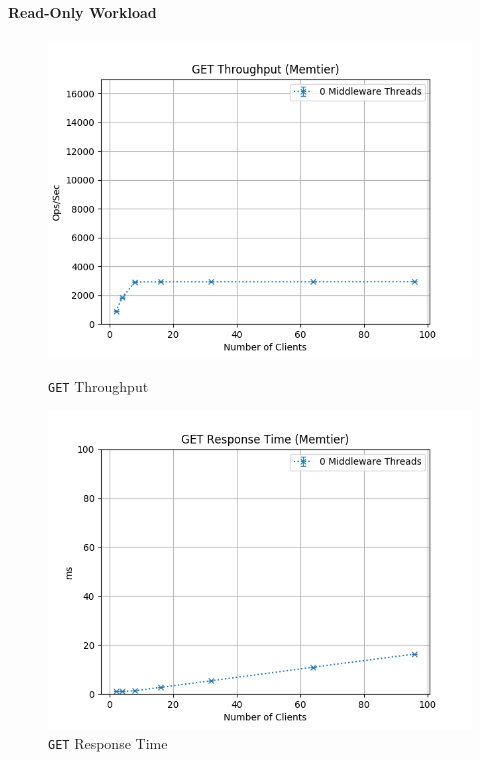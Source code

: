 \documentclass[11pt,a4paper]{article}
\begin{document}
\paragraph{Read-Only Workload}
%
\begin{figure}[H]
	\centering
    \begin{minipage}{0.5\textwidth}
        \centering
        \includegraphics[width=\textwidth]{../illustrations/plots/1_2_two_servers/0-1/memtier_get_tp_s.png}
        \caption{\texttt{GET} Throughput}
        \label{fig:two_servers_get_tp}
    \end{minipage}\hfill
    \begin{minipage}{0.5\textwidth}
        \centering
        \includegraphics[width=\textwidth]{../illustrations/plots/1_2_two_servers/0-1/memtier_get_rt_ms.png}
        \caption{\texttt{GET} Response Time}
        \label{fig:two_servers_get_rt}
    \end{minipage}
\end{figure}
\end{document}
